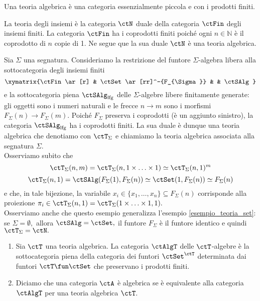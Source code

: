 \begin{definition}\label{def_teoria_alg}
Una teoria algebrica è una categoria essenzialmente piccola e con i prodotti finiti.
\end{definition} 

\begin{example}\label{esempio_teoria_set}
La teoria degli insiemi è la categoria $\ctN$ duale della categoria $\ctFin$ degli insiemi finiti. La categoria $\ctFin$ ha i coprodotti 
finiti poiché ogni $n \in \mathbb N$ è il coprodotto di $n$ copie di 1. Ne segue que la sua duale $\ctN$ è una teoria algebrica.
\end{example} 

\begin{example}\label{esempio_teoria_sigma}
Sia $\Sigma$ una segnatura. Consideriamo la restrizione del funtore $\Sigma$-algebra libera alla sottocategoria degli insiemi finiti
$$\xymatrix{\ctFin \ar[r] & \ctSet \ar[rr]^-{F_{\Sigma}} & & \ctSAlg}$$
e la sottocategoria piena $\ctSAlg_{\mathrm{lfg}}$ delle $\Sigma$-algebre libere finitamente generate: gli oggetti sono i numeri naturali e le frecce
$n \to m$ sono i morfismi $F_{\Sigma}(n) \to F_{\Sigma}(m).$ Poiché $F_{\Sigma}$ preserva i coprodotti (è un aggiunto sinistro), la 
categoria $\ctSAlg_{\mathrm{lfg}}$ ha i coprodotti finiti. La sua duale è dunque una teoria algebrica che denotiamo con $\ctT_{\Sigma}$ e
chiamiamo la teoria algebrica associata alla segnatura $\Sigma.$ \\
Osserviamo subito che
$$\ctT_{\Sigma}(n,m) = \ctT_{\Sigma}(n,1 \times \ldots \times 1) \simeq \ctT_{\Sigma}(n,1)^m$$
$$\ctT_{\Sigma}(n,1) = \ctSAlg(F_{\Sigma}(1),F_{\Sigma}(n)) \simeq \ctSet(1,F_{\Sigma}(n)) \simeq F_{\Sigma}(n)$$
e che, in tale bijezione, la variabile $x_i \in \{x_1,\ldots,x_n\} \subseteq F_{\Sigma}(n)$ corrisponde alla proiezione 
$\pi_i \in \ctT_{\Sigma}(n,1) = \ctT_{\Sigma}(1 \times \ldots \times 1,1).$ \\
Osserviamo anche che questo esempio generalizza l'esempio \ref{esempio_teoria_set}: se $\Sigma = \emptyset,$ allora $\ctSAlg = \ctSet,$
il funtore $F_{\Sigma}$ è il funtore identico e quindi $\ctT_{\Sigma} = \ctN.$
\end{example} 

\begin{definition}\label{def_Talg}
\hfill
\begin{enumerate}
\item Sia $\ctT$ una teoria algebrica. La categoria $\ctAlgT$ delle $\ctT$-algebre è la sottocategoria piena della categoria dei funtori
$\ctSet^{\ctT}$ determinata dai funtori $\ctT \fun \ctSet$ che preservano i prodotti finiti.
\item Diciamo che una categoria $\ctA$ è algebrica se è equivalente alla categoria $\ctAlgT$ per una teoria algebrica $\ctT.$
\end{enumerate}
\end{definition}

